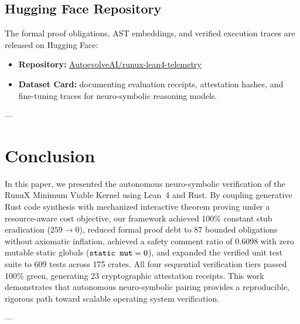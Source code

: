 \documentclass[10pt,twocolumn,letterpaper]{article}
\theoremstyle{definition}
\begin{document}
\subsection{Hugging Face Repository}
The formal proof obligations, AST embeddings, and verified execution traces are released on Hugging Face:
\begin{itemize}
    \item \textbf{Repository:} {\small\url{AutoevolveAI/runux-lean4-telemetry}}
    \item \textbf{Dataset Card:}  documenting evaluation receipts, attestation hashes, and fine-tuning traces for neuro-symbolic reasoning models.
\end{itemize}

---

\section{Conclusion}
\label{sec:conclusion}

In this paper, we presented the autonomous neuro-symbolic verification of the RunuX Minimum Viable Kernel using Lean~4 and Rust. By coupling generative Rust code synthesis with mechanized interactive theorem proving under a resource-aware cost objective, our framework achieved 100\% constant stub eradication ($259 \to 0$), reduced formal proof debt to 87 bounded obligations without axiomatic inflation, achieved a safety comment ratio of 0.6098 with zero mutable static globals ($\text{\texttt{static mut}} = 0$), and expanded the verified unit test suite to 609 tests across 175 crates. All four sequential verification tiers passed 100\% green, generating 23 cryptographic attestation receipts. This work demonstrates that autonomous neuro-symbolic pairing provides a reproducible, rigorous path toward scalable operating system verification.

---



\end{document}
